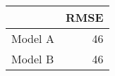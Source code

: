 
\begin{tabular}{l|r}
\hline
  & RMSE\\
\hline
Model A & 46\\
\hline
Model B & 46\\
\hline
\end{tabular}